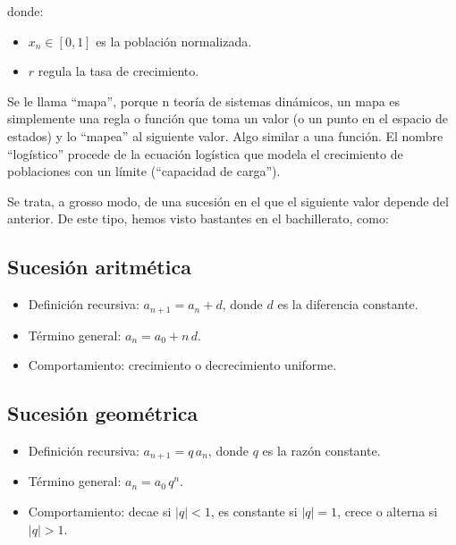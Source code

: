 \documentclass[
  11pt,
  a4paper,
  DIV=11,
  numbers=noendperiod]{scrreprt}
\providecommand{\tightlist}{%
  \setlength{\itemsep}{0pt}\setlength{\parskip}{0pt}}
\begin{document}
donde:

\begin{itemize}
\tightlist
\item
  \(x_n \in [0,1]\) es la población normalizada.
\item
  \(r\) regula la tasa de crecimiento.
\end{itemize}

Se le llama ``mapa'', porque n teoría de sistemas dinámicos, un mapa es
simplemente una regla o función que toma un valor (o un punto en el
espacio de estados) y lo ``mapea'' al siguiente valor. Algo similar a
una función. El nombre ``logístico'' procede de la ecuación logística
que modela el crecimiento de poblaciones con un límite (``capacidad de
carga'').

Se trata, a grosso modo, de una sucesión en el que el siguiente valor
depende del anterior. De este tipo, hemos visto bastantes en el
bachillerato, como:

\subsection{Sucesión aritmética}\label{sucesiuxf3n-aritmuxe9tica}

\begin{itemize}
\tightlist
\item
  Definición recursiva: \(a_{n+1} = a_n + d\), donde \(d\) es la
  diferencia constante.\\
\item
  Término general: \(a_n = a_0 + n\,d\).\\
\item
  Comportamiento: crecimiento o decrecimiento uniforme.
\end{itemize}

\subsection{Sucesión geométrica}\label{sucesiuxf3n-geomuxe9trica}

\begin{itemize}
\tightlist
\item
  Definición recursiva: \(a_{n+1} = q\,a_n\), donde \(q\) es la razón
  constante.\\
\item
  Término general: \(a_n = a_0\,q^n\).\\
\item
  Comportamiento: decae si \(|q|<1\), es constante si \(|q|=1\), crece o
  alterna si \(|q|>1\).
\end{itemize}
\end{document}
